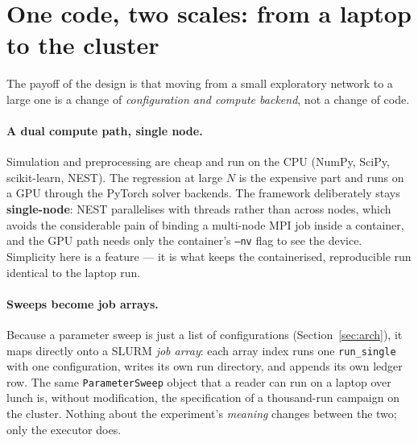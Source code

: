 \documentclass[11pt,a4paper]{article}
\newcommand{\code}[1]{\texttt{#1}}
\begin{document}
\section{One code, two scales: from a laptop to the cluster}
\label{sec:hpc}

The payoff of the design is that moving from a small exploratory network to a large one is a
change of \emph{configuration and compute backend}, not a change of code.

\paragraph{A dual compute path, single node.}
Simulation and preprocessing are cheap and run on the CPU (NumPy, SciPy, scikit-learn,
NEST). The regression at large $N$ is the expensive part and runs on a GPU through the PyTorch
solver backends. The framework deliberately stays \textbf{single-node}: NEST parallelises with
threads rather than across nodes, which avoids the considerable pain of binding a multi-node MPI
job inside a container, and the GPU path needs only the container's \code{--nv} flag to see the
device. Simplicity here is a feature --- it is what keeps the containerised, reproducible run
identical to the laptop run.

\paragraph{Sweeps become job arrays.}
Because a parameter sweep is just a list of configurations
(Section~\ref{sec:arch}), it maps directly onto a SLURM \emph{job array}: each array index runs
one \code{run\_single} with one configuration, writes its own run directory, and appends its own
ledger row. The same \code{ParameterSweep} object that a reader can run on a laptop over lunch is,
without modification, the specification of a thousand-run campaign on the cluster. Nothing about
the experiment's \emph{meaning} changes between the two; only the executor does.
\end{document}
